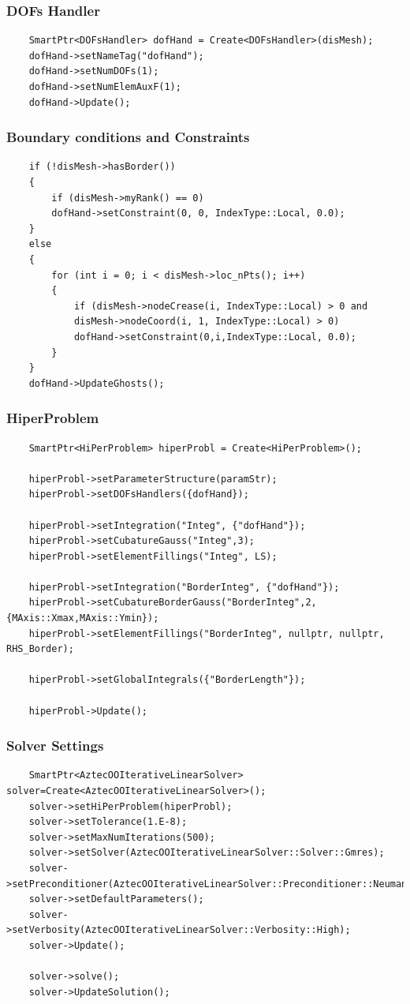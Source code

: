 \documentclass[]{article}
\begin{document}
\subsubsection{DOFs Handler} \label{sec: dofC}
\begin{lstlisting}
	SmartPtr<DOFsHandler> dofHand = Create<DOFsHandler>(disMesh);
	dofHand->setNameTag("dofHand");
	dofHand->setNumDOFs(1);
	dofHand->setNumElemAuxF(1);
	dofHand->Update();
\end{lstlisting}

\subsubsection{Boundary conditions and Constraints} \label{sec: BC}
\begin{lstlisting}
	if (!disMesh->hasBorder())
	{
		if (disMesh->myRank() == 0)
		dofHand->setConstraint(0, 0, IndexType::Local, 0.0);
	}
	else
	{
		for (int i = 0; i < disMesh->loc_nPts(); i++)
		{
			if (disMesh->nodeCrease(i, IndexType::Local) > 0 and
			disMesh->nodeCoord(i, 1, IndexType::Local) > 0)
			dofHand->setConstraint(0,i,IndexType::Local, 0.0);
		}
	}
	dofHand->UpdateGhosts();
\end{lstlisting}

\subsubsection{HiperProblem} \label{sec: hpc}
\begin{lstlisting}
	SmartPtr<HiPerProblem> hiperProbl = Create<HiPerProblem>();
	
	hiperProbl->setParameterStructure(paramStr);
	hiperProbl->setDOFsHandlers({dofHand});
	
	hiperProbl->setIntegration("Integ", {"dofHand"});
	hiperProbl->setCubatureGauss("Integ",3);
	hiperProbl->setElementFillings("Integ", LS);
	
	hiperProbl->setIntegration("BorderInteg", {"dofHand"});
	hiperProbl->setCubatureBorderGauss("BorderInteg",2,{MAxis::Xmax,MAxis::Ymin});
	hiperProbl->setElementFillings("BorderInteg", nullptr, nullptr, RHS_Border);
	
	hiperProbl->setGlobalIntegrals({"BorderLength"});
	
	hiperProbl->Update();
\end{lstlisting}

\subsubsection{Solver Settings} \label{sec: slv}
\begin{lstlisting}
	SmartPtr<AztecOOIterativeLinearSolver> solver=Create<AztecOOIterativeLinearSolver>();
	solver->setHiPerProblem(hiperProbl);
	solver->setTolerance(1.E-8);
	solver->setMaxNumIterations(500);
	solver->setSolver(AztecOOIterativeLinearSolver::Solver::Gmres);
	solver->setPreconditioner(AztecOOIterativeLinearSolver::Preconditioner::Neumann);
	solver->setDefaultParameters();
	solver->setVerbosity(AztecOOIterativeLinearSolver::Verbosity::High);
	solver->Update();
	
	solver->solve();
	solver->UpdateSolution();
\end{lstlisting}
\end{document}
